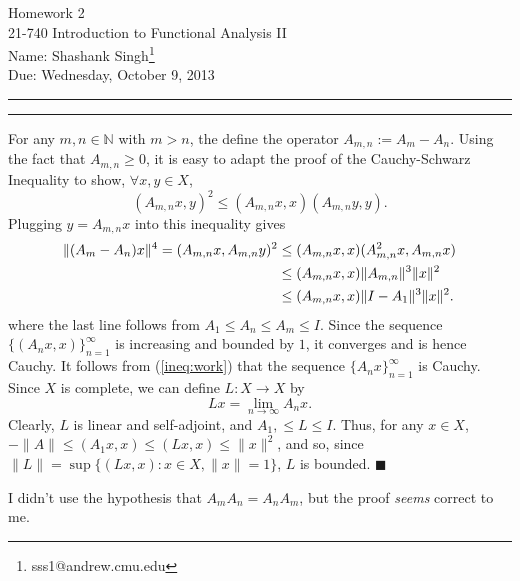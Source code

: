 \documentclass[11pt]{article}
\makeatletter
\newcounter{questionCounter}
\newcounter{partCounter}[questionCounter]
\newenvironment{question}[2][\arabic{questionCounter}]{%
    \setcounter{partCounter}{0}%
    \vspace{.25in} \hrule \vspace{0.5em}%
        \noindent{\bf #2}%
    \vspace{0.8em} \hrule \vspace{.10in}%
    \addtocounter{questionCounter}{1}%
}{}
\newcommand{\myname}{Shashank Singh\footnote{sss1@andrew.cmu.edu}}
\newcommand{\myclass}{21-740 Introduction to Functional Analysis II}
\newcommand{\myhwnum}{2}
\newcommand{\duedate}{Wednesday, October 9, 2013}
\renewcommand{\qed}{\quad \ensuremath{\blacksquare}}
\newcommand{\N}{\mathbb{N}}             %
\makeatother
\begin{document}
\thispagestyle{plain}

{\Large Homework \myhwnum} \\
\myclass \\
Name: \myname \\
Due: \duedate

\begin{question}{Problem 1}
For any $m,n \in \N$ with $m > n$, the define the operator
$A_{m,n} := A_m - A_n$. Using the fact that $A_{m,n} \geq 0$, it is easy to
adapt the proof of the Cauchy-Schwarz Inequality to show, $\forall x,y \in X$,
\begin{equation}
\label{ineq:schwarz}
(A_{m,n} x,y)^2 \leq (A_{m,n} x,x)(A_{m,n} y,y).
\end{equation}
Plugging $y = A_{m,n} x$ into this inequality gives
\begin{align}
\notag
\|(A_m - A_n)x\|^4
     = (A_{m,n} x,A_{m,n} y)^2
 &   \leq (A_{m,n}x,x)(A_{m,n}^2x,A_{m,n}x)  \\
\notag
 &   \leq (A_{m,n}x,x)\|A_{m,n}\|^3\|x\|^2        \\
\label{ineq:work}
 &   \leq (A_{m,n}x,x)\|I - A_1\|^3\|x\|^2.
\end{align}
where the last line follows from $A_1 \leq A_n \leq A_m \leq I$. Since the
sequence  $\{(A_nx,x)\}_{n = 1}^\infty$ is increasing and bounded by $1$,
it converges and is hence Cauchy. It follows from (\ref{ineq:work}) that the
sequence $\{A_nx\}_{n = 1}^\infty$ is Cauchy. Since $X$ is complete, we can
define $L : X \to X$ by
\[Lx = \lim_{n \to \infty} A_n x.\]
Clearly, $L$ is linear and self-adjoint, and $A_1, \leq L \leq I$. Thus, for
any $x \in X$, $-\|A\| \leq (A_1x,x) \leq (Lx,x) \leq \|x\|^2$, and so, since
$\|L\| = \sup \{(Lx,x) : x \in X, \|x\| = 1\}$, $L$ is bounded. \qed

I didn't use the hypothesis that $A_mA_n = A_nA_m$, but the proof \emph{seems}
correct to me.
\end{question}
\end{document}
